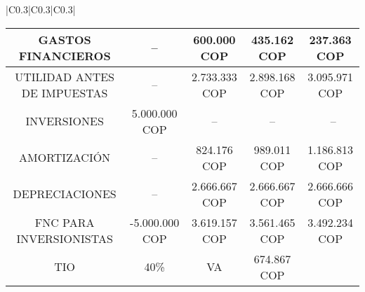 \begin{center}
\begin{longtable}[H]{|C{0.3\linewidth}|C{0.3\linewidth}|C{0.3\linewidth}|}
{{\begin{tabular}{|c |c |c |c |c |}
                            	GASTOS FINANCIEROS          & --           & 600.000 COP   & 435.162 COP    &  237.363 COP   \\\hline
                            	UTILIDAD ANTES DE IMPUESTAS & --           &  2.733.333 COP & 2.898.168 COP  & 3.095.971 COP  \\\hline
                            	INVERSIONES                 & 5.000.000 COP  & --           & --           & \ --         \\\hline
                            	AMORTIZACIÓN                & --           &  824.176 COP   & 989.011 COP    &  1.186.813 COP \\\hline
                            	DEPRECIACIONES              & --           &  2.666.667 COP & 2.666.667 COP  &  2.666.666 COP \\\hline
                            	FNC PARA INVERSIONISTAS     & -5.000.000 COP &  3.619.157 COP & 3.561.465 COP  &  3.492.234 COP \\\hline
                            	TIO                         & 40\%         & VA           &  674.867 COP       &           \\\hline
                        \end{tabular}}
		}\\ 
		\\
		\\
        		\\
		\\ 
		\\

\end{longtable}
\end{center}
